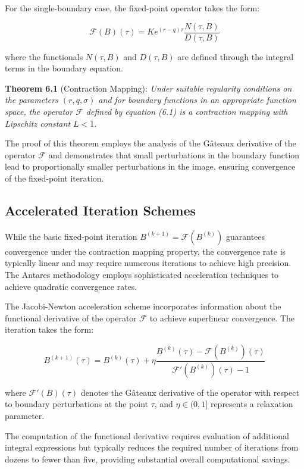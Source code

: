 \documentclass[
  american,
  11pt,
  11pt,
  letterpaper,
  onecolumn]{article}
\begin{document}
For the single-boundary case, the fixed-point operator takes the form:

\[\mathcal{F}(B)(\tau) = K e^{(r-q)\tau} \frac{N(\tau,B)}{D(\tau,B)} \tag{6.1}\]

where the functionals \(N(\tau,B)\) and \(D(\tau,B)\) are defined
through the integral terms in the boundary equation.

\textbf{Theorem 6.1} (Contraction Mapping): \emph{Under suitable
regularity conditions on the parameters \((r,q,\sigma)\) and for
boundary functions in an appropriate function space, the operator
\(\mathcal{F}\) defined by equation (6.1) is a contraction mapping with
Lipschitz constant \(L < 1\).}

The proof of this theorem employs the analysis of the Gâteaux derivative
of the operator \(\mathcal{F}\) and demonstrates that small
perturbations in the boundary function lead to proportionally smaller
perturbations in the image, ensuring convergence of the fixed-point
iteration.

\subsection{Accelerated Iteration
Schemes}\label{accelerated-iteration-schemes}

While the basic fixed-point iteration
\(B^{(k+1)} = \mathcal{F}(B^{(k)})\) guarantees convergence under the
contraction mapping property, the convergence rate is typically linear
and may require numerous iterations to achieve high precision. The
Antares methodology employs sophisticated acceleration techniques to
achieve quadratic convergence rates.

The Jacobi-Newton acceleration scheme incorporates information about the
functional derivative of the operator \(\mathcal{F}\) to achieve
superlinear convergence. The iteration takes the form:

\[B^{(k+1)}(\tau) = B^{(k)}(\tau) + \eta \frac{B^{(k)}(\tau) - \mathcal{F}(B^{(k)})(\tau)}{\mathcal{F}'(B^{(k)})(\tau) - 1} \tag{6.2}\]

where \(\mathcal{F}'(B)(\tau)\) denotes the Gâteaux derivative of the
operator with respect to boundary perturbations at the point \(\tau\),
and \(\eta \in (0,1]\) represents a relaxation parameter.

The computation of the functional derivative requires evaluation of
additional integral expressions but typically reduces the required
number of iterations from dozens to fewer than five, providing
substantial overall computational savings.
\end{document}
